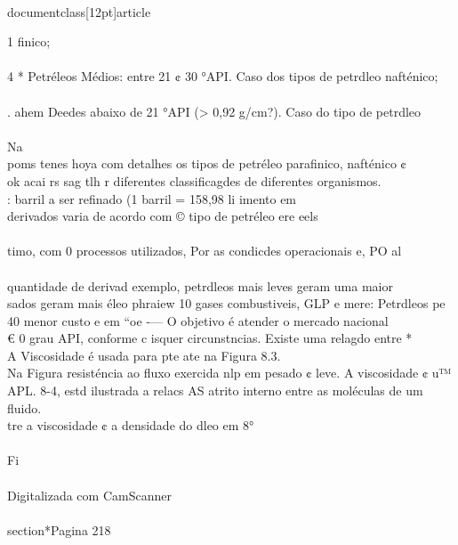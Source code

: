 \\documentclass[12pt]{article}
\begin{document}
1 finico;\\
\\
4 * Petréleos Médios: entre 21 ¢ 30 °API. Caso dos tipos de petrdleo nafténico;\\
\\
. ahem Deedes abaixo de 21 °API (> 0,92 g/cm?). Caso do tipo de petrdleo\\
\\
Na\\
poms tenes hoya com detalhes os tipos de petréleo parafinico, nafténico ¢\\
ok acai rs sag tlh r diferentes classificagdes de diferentes organismos.\\
: barril a ser refinado (1 barril = 158,98 li imento em\\
derivados varia de acordo com © tipo de petréleo ere eels\\
\\
timo, com 0 processos utilizados, Por as condicdes operacionais e, PO al\\
\\
quantidade de derivad exemplo, petrdleos mais leves geram uma maior\\
sados geram mais éleo phraiew 10 gases combustiveis, GLP e mere: Petrdleos pe\\
40 menor custo e em “oe -— O objetivo é atender o mercado nacional\\
€ 0 grau API, conforme c isquer circunstncias. Existe uma relagdo entre *\\
A Viscosidade é usada para pte ate na Figura 8.3.\\
Na Figura resisténcia ao fluxo exercida nlp em pesado ¢ leve. A viscosidade ¢ u™\\
APL. 8-4, estd ilustrada a relacs AS atrito interno entre as moléculas de um fluido.\\
tre a viscosidade ¢ a densidade do dleo em 8°\\
\\
Fi\\
\\
Digitalizada com CamScanner\\

\\section*{Pagina 218}
\end{document}
